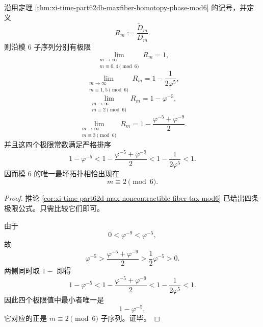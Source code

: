 \begin{corollary}[最大非可缩纤维的拓扑保真比具有唯一最坏相]\label{cor:xi-time-part62db-maxfiber-fidelity-worst-phase}
沿用定理 \ref{thm:xi-time-part62db-maxfiber-homotopy-phase-mod6} 的记号，并定义
\[
R_m:=\frac{\widetilde D_m}{D_m}.
\]
则沿模 \(6\) 子序列分别有极限
\[
\lim_{\substack{m\to\infty\\ m\equiv 0,4\!\!\!\!\pmod 6}}R_m=1,
\]
\[
\lim_{\substack{m\to\infty\\ m\equiv 1,5\!\!\!\!\pmod 6}}R_m
=
1-\frac{1}{2\varphi^5},
\]
\[
\lim_{\substack{m\to\infty\\ m\equiv 2\!\!\!\!\pmod 6}}R_m
=
1-\varphi^{-5},
\]
\[
\lim_{\substack{m\to\infty\\ m\equiv 3\!\!\!\!\pmod 6}}R_m
=
1-\frac{\varphi^{-5}+\varphi^{-9}}{2}.
\]
并且这四个极限常数满足严格排序
\[
1-\varphi^{-5}
<
1-\frac{\varphi^{-5}+\varphi^{-9}}{2}
<
1-\frac{1}{2\varphi^5}
<
1.
\]
因而模 \(6\) 的唯一最坏拓扑相恰出现在
\[
m\equiv 2\pmod 6.
\]
\end{corollary}
\begin{proof}
推论 \ref{cor:xi-time-part62d-max-noncontractible-fiber-tax-mod6} 已给出四条极限公式。只需比较它们即可。

由于
\[
0<\varphi^{-9}<\varphi^{-5},
\]
故
\[
\varphi^{-5}
>
\frac{\varphi^{-5}+\varphi^{-9}}{2}
>
\frac12\varphi^{-5}
>
0.
\]
两侧同时取 \(1-\) 即得
\[
1-\varphi^{-5}
<
1-\frac{\varphi^{-5}+\varphi^{-9}}{2}
<
1-\frac{1}{2\varphi^5}
<
1.
\]
因此四个极限值中最小者唯一是
\[
1-\varphi^{-5},
\]
它对应的正是 \(m\equiv 2\pmod 6\) 子序列。证毕。
\end{proof}

